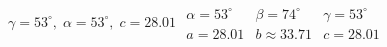 { $\gamma = 53^{\circ}, \; \alpha = 53^{\circ}, \; c = 28.01$ \label{secondarea}}
{$\begin{array}{lll}\alpha = 53^{\circ} & \beta = 74^{\circ} & \gamma = 53^{\circ} \\a = 28.01 & b \approx 33.71 & c = 28.01 \end{array}$}
